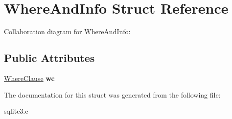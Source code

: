 \hypertarget{structWhereAndInfo}{}\section{Where\+And\+Info Struct Reference}
\label{structWhereAndInfo}


Collaboration diagram for Where\+And\+Info\+:
\subsection*{Public Attributes}
\begin{DoxyCompactItemize}
\item 
\hyperlink{structWhereClause}{Where\+Clause} {\bfseries wc}\hypertarget{structWhereAndInfo_a01cea99f069b1e598004a1cd0d0c3a80}{}\label{structWhereAndInfo_a01cea99f069b1e598004a1cd0d0c3a80}

\end{DoxyCompactItemize}


The documentation for this struct was generated from the following file\+:\begin{DoxyCompactItemize}
\item 
sqlite3.\+c\end{DoxyCompactItemize}
